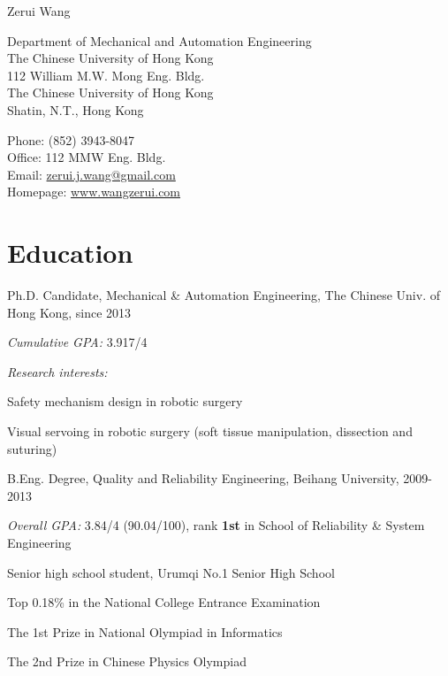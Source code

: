 \documentclass[10pt,letterpaper]{article}
\def\name{Zerui Wang}
\renewenvironment{itemize}{
  \begin{list}{}{
    \setlength{\leftmargin}{1.5em}
    \setlength{\itemsep}{0.25em}
    \setlength{\parskip}{0pt}
    \setlength{\parsep}{0.25em}
  }
}{
  \end{list}
}
\begin{document}
{\huge \name}


\bigskip

\begin{minipage}[t]{0.595\textwidth}
  Department of Mechanical and Automation Engineering \\
  The Chinese University of Hong Kong \\
  112 William M.W. Mong Eng. Bldg. \\
  The Chinese University of Hong Kong \\
  Shatin, N.T., Hong Kong
\end{minipage}
\begin{minipage}[t]{0.395\textwidth}
  Phone: (852) 3943-8047 \\
  Office: 112 MMW Eng. Bldg. \\
  Email: \href{mailto:zerui.j.wang@gmail.com}{zerui.j.wang@gmail.com} \\
  Homepage: \href{http://www.wangzerui.com/}{www.wangzerui.com}
\end{minipage}

\section*{Education}

\begin{itemize}
  \item Ph.D. Candidate, Mechanical \& Automation Engineering, The Chinese Univ. of Hong Kong, since 2013
    \begin{itemize}
    \item \emph{Cumulative GPA:} 3.917/4
    \item \emph{Research interests:}
      \begin{itemize}
      \item Safety mechanism design in robotic surgery
      \item Visual servoing in robotic surgery (soft tissue manipulation, dissection and suturing)
      \end{itemize}
    \end{itemize}
  \item B.Eng. Degree, Quality and Reliability Engineering, Beihang University, 2009-2013
    \begin{itemize}
    \item \emph{Overall GPA:} 3.84/4 (90.04/100), rank \textbf{1st} in School of Reliability \& System Engineering
    \end{itemize}
  \item Senior high school student, Urumqi No.1 Senior High School
    \begin{itemize}
    \item Top 0.18\% in the National College Entrance Examination
    \item The 1st Prize in National Olympiad in Informatics
    \item The 2nd Prize in Chinese Physics Olympiad
    \end{itemize}
\end{itemize}
\end{document}
